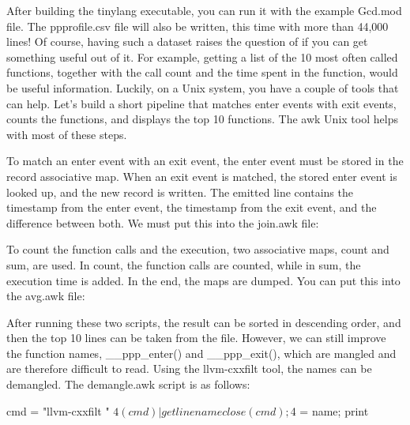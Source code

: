 After building the tinylang executable, you can run it with the example Gcd.mod file. The ppprofile.csv file will also be written, this time with more than 44,000 lines! Of course, having such a dataset raises the question of if you can get something useful out of it. For example, getting a list of the 10 most often called functions, together with the call count and the time spent in the function, would be useful information. Luckily, on a Unix system, you have a couple of tools that can help. Let’s build a short pipeline that matches enter events with exit events, counts the functions, and displays the top 10 functions. The awk Unix tool helps with most of these steps.

To match an enter event with an exit event, the enter event must be stored in the record associative map. When an exit event is matched, the stored enter event is looked up, and the new record is written. The emitted line contains the timestamp from the enter event, the timestamp from the exit event, and the difference between both. We must put this into the join.awk file:


To count the function calls and the execution, two associative maps, count and sum, are used. In count, the function calls are counted, while in sum, the execution time is added. In the end, the maps are dumped. You can put this into the avg.awk file:


After running these two scripts, the result can be sorted in descending order, and then the top 10 lines can be taken from the file. However, we can still improve the function names, \_\_ppp\_enter() and \_\_ppp\_exit(), which are mangled and are therefore difficult to read. Using the llvm-cxxfilt tool, the names can be demangled. The demangle.awk script is as follows:

\begin{shell}
{ cmd = "llvm-cxxfilt " $4
    (cmd) | getline name
    close(cmd); $4 = name; print }
\end{shell}

